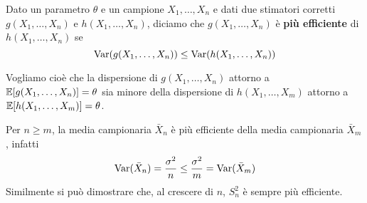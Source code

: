 \begin{definition}\label{def: stimatore efficiente}
	Dato un parametro $\theta$ e un campione $X_1, \dots, X_n$ e dati due stimatori corretti
	$g(X_1, \dots, X_n)$ e $h(X_1, \dots, X_n)$, diciamo che $g(X_1, \dots, X_n)$ è
	\textbf{più efficiente} di $h(X_1, \dots, X_n)$ se
	\[ \operatorname{Var}(g(X_1, \dots, X_n)) \leq \operatorname{Var}(h(X_1, \dots, X_n)) \]
\end{definition}

Vogliamo cioè che la dispersione di $g(X_1, \dots, X_n)$ attorno a
$\mathbb{E}[g(X_1, \dots, X_n)] = \theta$ sia minore della dispersione di $h(X_1, \dots, X_m)$ attorno a
$\mathbb{E}[h(X_1, \dots, X_m)] = \theta$.

Per $n \geq m$, la media campionaria $\bar{X}_n$ è più efficiente della media campionaria
$\bar{X}_m$, infatti
\[ \operatorname{Var}(\bar{X}_n) = \frac{\sigma^2}{n} \leq \frac{\sigma^2}{m} = \operatorname{Var}(\bar{X}_m) \]
Similmente si può dimostrare che, al crescere di $n$, $S_n^2$ è sempre più efficiente.
